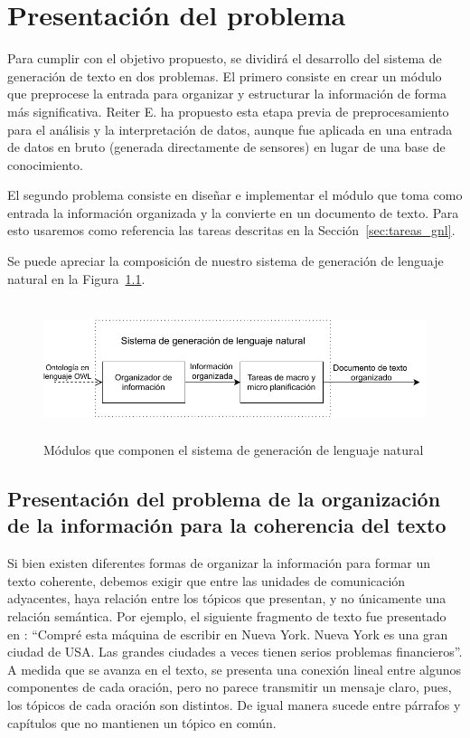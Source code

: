 \chapter{Presentación del problema}

Para cumplir con el objetivo propuesto, se dividirá el desarrollo del sistema de generación de texto en dos problemas. El primero consiste en crear un módulo que preprocese la entrada para organizar y estructurar la información de forma más significativa. Reiter E. ha propuesto esta etapa previa de preprocesamiento~\cite{reiter2007architecture} para el análisis y la interpretación de datos, aunque fue aplicada en una entrada de datos en bruto (generada directamente de sensores) en lugar de una base de conocimiento.

El segundo problema consiste en diseñar e implementar el módulo que toma como entrada la información organizada y la convierte en un documento de texto. Para esto usaremos como referencia las tareas descritas en la Sección~\ref{sec:tareas_gnl}.

Se puede apreciar la composición de nuestro sistema de generación de lenguaje natural en la Figura~\ref{fig:modulos_sgln}.

\begin{figure}
    \centering
    \includegraphics[width=12cm, height=4cm]{img/presentacion_problema/modulos_sgln.pdf}
    \caption{Módulos que componen el sistema de generación de lenguaje natural}
    \label{fig:modulos_sgln}
\end{figure}

\section{Presentación del problema de la organización de la información para la coherencia del texto}
\label{sec:problema_coherencia-texto}
Si bien existen diferentes formas de organizar la información para formar un texto coherente, debemos exigir que entre las unidades de comunicación adyacentes, haya relación entre los tópicos que presentan, y no únicamente una relación semántica. Por ejemplo, el siguiente fragmento de texto fue presentado en \cite{van1983ciencia}:
``Compré esta máquina de escribir en Nueva York. Nueva York es una gran ciudad de USA. Las grandes ciudades a veces tienen serios problemas financieros''. A medida que se avanza en el texto, se presenta una conexión lineal entre algunos componentes de cada oración, pero no parece transmitir un mensaje claro, pues, los tópicos de cada oración son distintos. De igual manera sucede entre párrafos y capítulos que no mantienen un tópico en común. 


